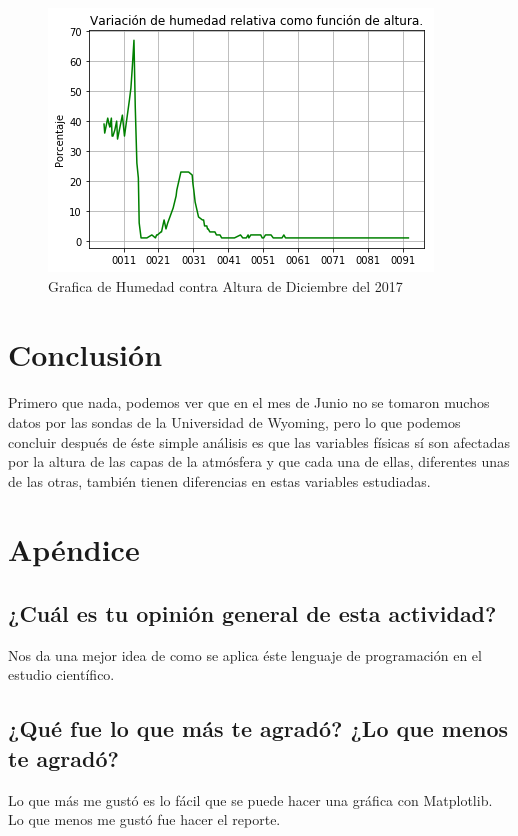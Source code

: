 \documentclass{article}
\begin{document}
\begin{figure}
\includegraphics[width=\linewidth]{HumedadDic.png}
\caption{Grafica de Humedad contra Altura de Diciembre del 2017}
\end{figure}

\newpage

\section{Conclusión}
Primero que nada, podemos ver que en el mes de Junio no se tomaron muchos datos por las sondas de la Universidad de Wyoming, pero lo que podemos concluir después de éste simple análisis es que las variables físicas sí son afectadas por la altura de las capas de la atmósfera y que cada una de ellas, diferentes unas de las otras, también tienen diferencias en estas variables estudiadas.

\section{Apéndice}
\subsection{¿Cuál es tu opinión general de esta actividad?}
Nos da una mejor idea de como se aplica éste lenguaje de programación en el estudio científico.
\subsection{¿Qué fue lo que más te agradó? ¿Lo que menos te agradó?}
Lo que más me gustó es lo fácil que se puede hacer una gráfica con Matplotlib.
Lo que menos me gustó fue hacer el reporte.
\end{document}
